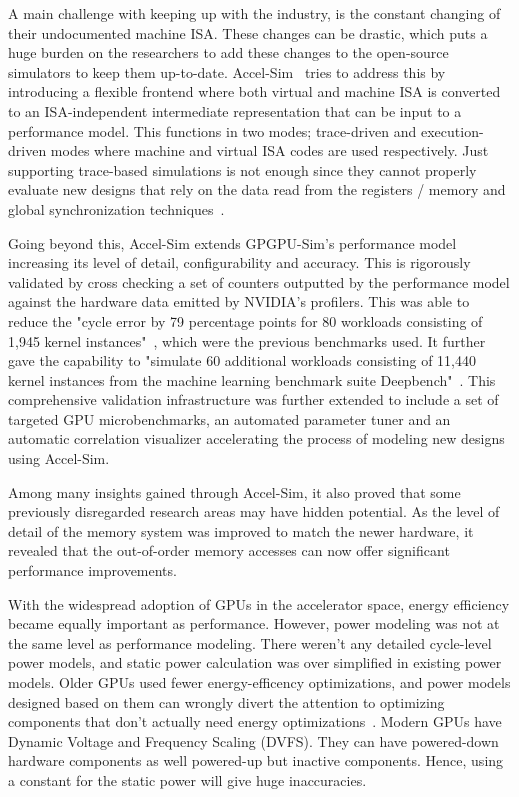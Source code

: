 A main challenge with keeping up with the industry, is the constant changing of their undocumented machine ISA.
These changes can be drastic, which puts a huge burden on the researchers to add these changes to the open-source simulators to keep them up-to-date.
Accel-Sim~\cite{Khairy2020} tries to address this by introducing a flexible frontend where both virtual and machine ISA is converted to an ISA-independent intermediate representation that can be input to a performance model.
This functions in two modes; trace-driven and execution-driven modes where machine and virtual ISA codes are used respectively.
Just supporting trace-based simulations is not enough since they cannot properly evaluate new designs that rely on the data read from the registers / memory and global synchronization techniques~\cite{Khairy2020}.

Going beyond this, Accel-Sim extends GPGPU-Sim's performance model increasing its level of detail, configurability and accuracy.
This is rigorously validated by cross checking a set of counters outputted by the performance model against the hardware data emitted by NVIDIA's profilers.
This was able to reduce the "cycle error by 79 percentage points for 80 workloads consisting of 1,945 kernel instances"~\cite{Khairy2020}, which were the previous benchmarks used.
It further gave the capability to "simulate 60 additional workloads consisting of 11,440 kernel instances from the machine learning benchmark suite Deepbench"~\cite{Khairy2020}.
This comprehensive validation infrastructure was further extended to include a set of targeted GPU microbenchmarks, an automated parameter tuner and an automatic correlation visualizer accelerating the process of modeling new designs using Accel-Sim.

Among many insights gained through Accel-Sim, it also proved that some previously disregarded research areas may have hidden potential.
As the level of detail of the memory system was improved to match the newer hardware, it revealed that the out-of-order memory accesses can now offer significant performance improvements.

With the widespread adoption of GPUs in the accelerator space, energy efficiency became equally important as performance.
However, power modeling was not at the same level as performance modeling.
There weren't any detailed cycle-level power models, and static power calculation was over simplified in existing power models.
Older GPUs used fewer energy-efficency optimizations, and power models designed based on them can wrongly divert the attention to optimizing components that don't actually need energy optimizations~\cite{Kandiah2021}.
Modern GPUs have Dynamic Voltage and Frequency Scaling (DVFS).
They can have powered-down hardware components as well powered-up but inactive components.
Hence, using a constant for the static power will give huge inaccuracies.

